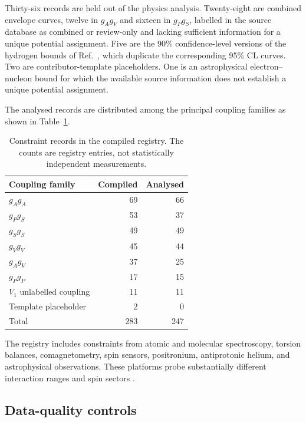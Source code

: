 \documentclass[aps,prd,reprint,superscriptaddress,nofootinbib]{revtex4-2}
\begin{document}
	Thirty-six records are held out of the physics analysis.
Twenty-eight are combined envelope curves, twelve in $g_Ag_V$ and sixteen
in $g_Pg_S$, labelled in the source database as combined or review-only
and lacking sufficient information for a unique potential assignment.
Five are the 90\% confidence-level versions of the hydrogen bounds of
Ref.~\cite{Cong2025b}, which duplicate the corresponding 95\% CL curves.
Two are contributor-template placeholders. One is an astrophysical
electron--nucleon bound for which the available source information does
not establish a unique potential assignment.
	
	The analysed records are distributed among the principal coupling
	families as shown in Table~\ref{tab:families}.
	
	\begin{table}[t]
		\caption{Constraint records in the compiled registry. The counts are
			registry entries, not statistically independent measurements.}
		\label{tab:families}
		\begin{ruledtabular}
			\begin{tabular}{lrr}
				Coupling family & Compiled & Analysed\\
				\hline
				$g_Ag_A$ & 69 & 66\\
				$g_Pg_S$ & 53 & 37\\
				$g_Sg_S$ & 49 & 49\\
				$g_Vg_V$ & 45 & 44\\
				$g_Ag_V$ & 37 & 25\\
				$g_Pg_P$ & 17 & 15\\
				$V_1$ unlabelled coupling & 11 & 11\\
				Template placeholder & 2 & 0\\
				\hline
				Total & 283 & 247
			\end{tabular}
		\end{ruledtabular}
	\end{table}
	
	The registry includes constraints from atomic and molecular
	spectroscopy, torsion balances, comagnetometry, spin sensors,
	positronium, antiprotonic helium, and astrophysical observations.
	These platforms probe substantially different interaction ranges and
	spin sectors \cite{Ficek2018,Adkins2022,Liang2023,Jiang2025,
		Cong2025,WuYan2026}.
	
	\subsection{Data-quality controls}
	
\end{document}
